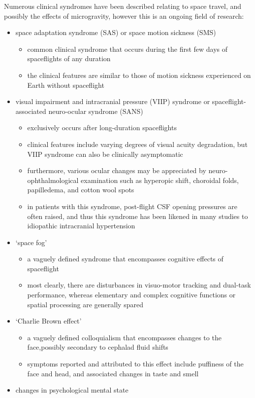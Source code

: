 Numerous clinical syndromes have been described relating to space travel, and possibly the effects of microgravity, however this is an ongoing field of research:

\begin{itemize}
	\tightlist
	\item
	space adaptation syndrome (SAS) or space motion sickness (SMS)
	
	\begin{itemize}
		\tightlist
		\item
		common clinical syndrome that occurs during the first few days of spaceflights of any duration 
		\item
		the clinical features are similar to those of motion sickness experienced on Earth without spaceflight 
	\end{itemize}
	\item
	visual impairment and intracranial pressure (VIIP) syndrome or spaceflight-associated neuro-ocular syndrome (SANS)
	
	\begin{itemize}
		\tightlist
		\item
		exclusively occurs after long-duration spaceflights 
		\item
		clinical features include varying degrees of visual acuity degradation, but VIIP syndrome can also be clinically asymptomatic 
		\item
		furthermore, various ocular changes may be appreciated by neuro-ophthalmological examination such as hyperopic shift, choroidal folds, papilledema, and cotton wool spots 
		\item
		in patients with this syndrome, post-flight CSF opening pressures are often raised, and thus this syndrome has been likened in many studies to idiopathic intracranial hypertension
	\end{itemize}
	\item
	`space fog'
	
	\begin{itemize}
		\tightlist
		\item
		a vaguely defined syndrome that encompasses cognitive effects of spaceflight 
		\item
		most clearly, there are disturbances in visuo-motor tracking and dual-task performance, whereas elementary and complex cognitive functions or spatial processing are generally spared 
	\end{itemize}
	\item
	`Charlie Brown effect'
	
	\begin{itemize}
		\tightlist
		\item
		a vaguely defined colloquialism that encompasses changes to the face,possibly secondary to cephalad fluid shifts 
		\item
		symptoms reported and attributed to this effect include puffiness of the face and head, and associated changes in taste and smell 
	\end{itemize}
	\item
	changes in psychological mental state 
\end{itemize}

